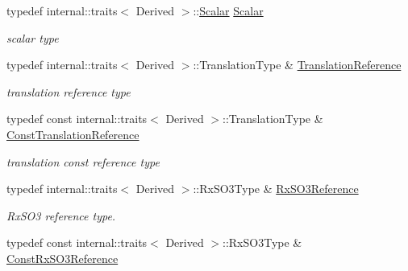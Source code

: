 \begin{DoxyCompactItemize}
\item 
typedef internal\+::traits$<$ Derived $>$\+::\hyperlink{class_sophus_1_1_sim3_group_base_abcf3d57b9fcc425bbc367a85a45a8092}{Scalar} \hyperlink{class_sophus_1_1_sim3_group_base_abcf3d57b9fcc425bbc367a85a45a8092}{Scalar}\hypertarget{class_sophus_1_1_sim3_group_base_abcf3d57b9fcc425bbc367a85a45a8092}{}\label{class_sophus_1_1_sim3_group_base_abcf3d57b9fcc425bbc367a85a45a8092}

\begin{DoxyCompactList}\small\item\em scalar type \end{DoxyCompactList}\item 
typedef internal\+::traits$<$ Derived $>$\+::Translation\+Type \& \hyperlink{class_sophus_1_1_sim3_group_base_a0491010ffcd9971dea880f7bce6910e5}{Translation\+Reference}\hypertarget{class_sophus_1_1_sim3_group_base_a0491010ffcd9971dea880f7bce6910e5}{}\label{class_sophus_1_1_sim3_group_base_a0491010ffcd9971dea880f7bce6910e5}

\begin{DoxyCompactList}\small\item\em translation reference type \end{DoxyCompactList}\item 
typedef const internal\+::traits$<$ Derived $>$\+::Translation\+Type \& \hyperlink{class_sophus_1_1_sim3_group_base_aee08d851899efe59011fb1b58dbf1139}{Const\+Translation\+Reference}\hypertarget{class_sophus_1_1_sim3_group_base_aee08d851899efe59011fb1b58dbf1139}{}\label{class_sophus_1_1_sim3_group_base_aee08d851899efe59011fb1b58dbf1139}

\begin{DoxyCompactList}\small\item\em translation const reference type \end{DoxyCompactList}\item 
typedef internal\+::traits$<$ Derived $>$\+::Rx\+S\+O3\+Type \& \hyperlink{class_sophus_1_1_sim3_group_base_a12827cf23c0ef3b94adbb088e8be891e}{Rx\+S\+O3\+Reference}\hypertarget{class_sophus_1_1_sim3_group_base_a12827cf23c0ef3b94adbb088e8be891e}{}\label{class_sophus_1_1_sim3_group_base_a12827cf23c0ef3b94adbb088e8be891e}

\begin{DoxyCompactList}\small\item\em Rx\+S\+O3 reference type. \end{DoxyCompactList}\item 
typedef const internal\+::traits$<$ Derived $>$\+::Rx\+S\+O3\+Type \& \hyperlink{class_sophus_1_1_sim3_group_base_ae170af2cf9301830de6fac478b322498}{Const\+Rx\+S\+O3\+Reference}\hypertarget{class_sophus_1_1_sim3_group_base_ae170af2cf9301830de6fac478b322498}{}\label{class_sophus_1_1_sim3_group_base_ae170af2cf9301830de6fac478b322498}


\end{DoxyCompactItemize}
